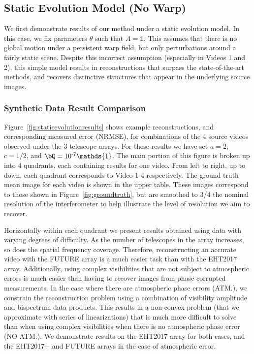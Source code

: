 \vspace{-.1in}
\subsection{Static Evolution Model (No Warp)}
\label{sec:nomotionresults}

We first demonstrate results of our method under a static evolution model. In this case, we fix parameters $\theta$ such that $A=\mathds{1}$. This assumes that there is no global motion under a persistent warp field, but only perturbations around a fairly static scene. Despite this incorrect assumption (especially in Videos 1 and 2), this simple model results in reconstructions that surpass the state-of-the-art methods, and recovers distinctive structures that appear in the underlying source images. 


\subsubsection{Synthetic Data Result Comparison}



Figure~\ref{fig:staticevolutionresults} shows example reconstructions, and corresponding measured error (NRMSE), for combinations of the 4 source videos observed under the 3 telescope arrays. For these results we have set $a=2$, $c=1/2$, and $\bQ = 10^{\text{-}7} \mathds{1}$. The main portion of this figure is broken up into 4 quadrants, each containing results for one video. From left to right, up to down, each quadrant corresponds to Video 1-4 respectively. The ground truth mean image for each video is shown in the upper table. These images correspond to those shown in Figure~\ref{fig:groundtruth}, but are smoothed to 3/4 the nominal resolution of the interferometer to help illustrate the level of resolution we aim to recover. 

Horizontally within each quadrant we present results obtained using data with varying degrees of difficulty. As the number of telescopes in the array increases, so does the spatial frequency coverage. Therefore, reconstructing an accurate video with the FUTURE array is a much easier task than with the EHT2017 array.
Additionally, using complex visibilities that are not subject to atmospheric errors is much easier than having to recover images from phase corrupted measurements. 
In the case where there are atmospheric phase errors (ATM.), we constrain the reconstruction problem using a combination of visibility amplitude and bispectrum data products. This results in a non-convex problem (that we approximate with series of linearizations) that is much more difficult to solve than when using complex visibilities when there is no atmospheric phase error (NO ATM.). We demonstrate results on the EHT2017 array for both cases, and the EHT2017+ and FUTURE arrays in the case of atmospheric error. 



